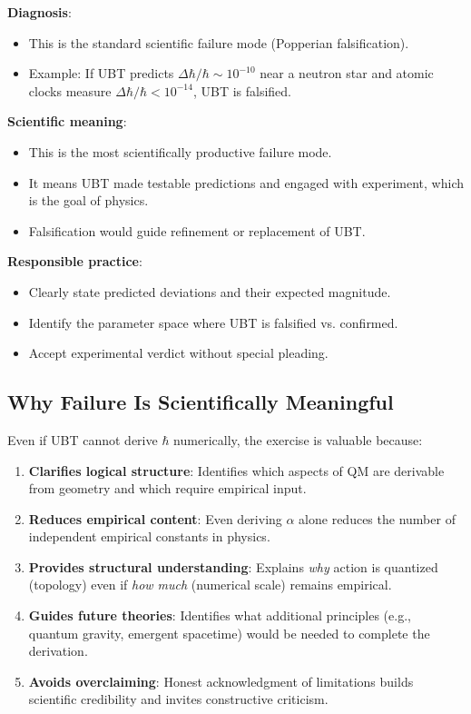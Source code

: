 \documentclass[12pt]{article}
\begin{document}
\textbf{Diagnosis}:
\begin{itemize}
\item This is the standard scientific failure mode (Popperian falsification).
\item Example: If UBT predicts $\Delta \hbar / \hbar \sim 10^{-10}$ near a neutron star and atomic clocks measure $\Delta \hbar / \hbar < 10^{-14}$, UBT is falsified.
\end{itemize}

\textbf{Scientific meaning}:
\begin{itemize}
\item This is the most scientifically productive failure mode.
\item It means UBT made testable predictions and engaged with experiment, which is the goal of physics.
\item Falsification would guide refinement or replacement of UBT.
\end{itemize}

\textbf{Responsible practice}:
\begin{itemize}
\item Clearly state predicted deviations and their expected magnitude.
\item Identify the parameter space where UBT is falsified vs. confirmed.
\item Accept experimental verdict without special pleading.
\end{itemize}

\subsection{Why Failure Is Scientifically Meaningful}

Even if UBT cannot derive $\hbar$ numerically, the exercise is valuable because:

\begin{enumerate}
\item \textbf{Clarifies logical structure}: Identifies which aspects of QM are derivable from geometry and which require empirical input.

\item \textbf{Reduces empirical content}: Even deriving $\alpha$ alone reduces the number of independent empirical constants in physics.

\item \textbf{Provides structural understanding}: Explains \emph{why} action is quantized (topology) even if \emph{how much} (numerical scale) remains empirical.

\item \textbf{Guides future theories}: Identifies what additional principles (e.g., quantum gravity, emergent spacetime) would be needed to complete the derivation.

\item \textbf{Avoids overclaiming}: Honest acknowledgment of limitations builds scientific credibility and invites constructive criticism.
\end{enumerate}
\end{document}
